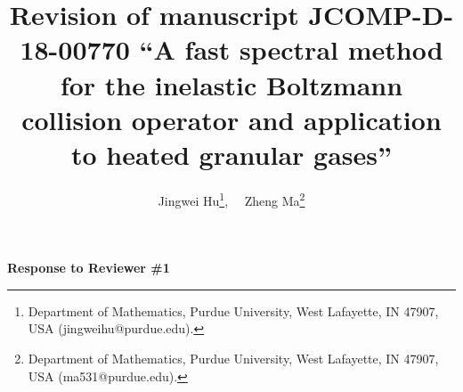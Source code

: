 \documentclass[11pt]{article}
\begin{document}
\title{Revision of manuscript JCOMP-D-18-00770  ``A fast spectral method for the inelastic Boltzmann collision operator and application to heated granular gases''}
\author{Jingwei Hu\footnote{Department of Mathematics, Purdue University, West Lafayette, IN 47907, USA (jingweihu@purdue.edu).}, \  \  
	    Zheng Ma\footnote{Department of Mathematics, Purdue University, West Lafayette, IN 47907, USA (ma531@purdue.edu).}
           }      
	\maketitle


\vspace{0.3in}
\centerline{{\large \bf{Response to Reviewer \#1}}}
\bigskip
\end{document}
